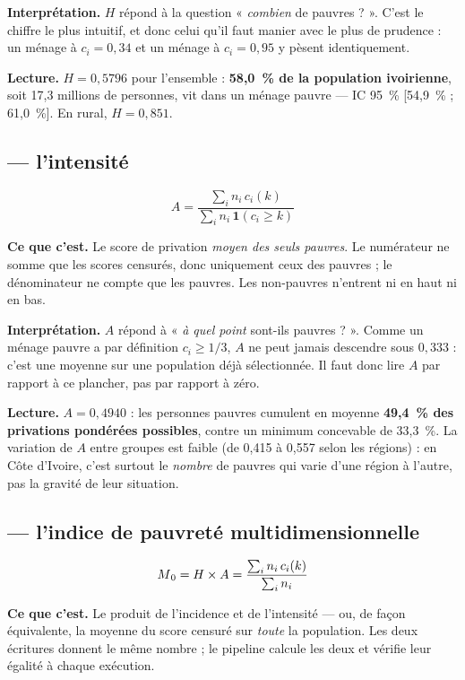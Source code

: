 \documentclass[11pt,a4paper]{article}
\begin{document}
\textbf{Interprétation.} $H$ répond à la question « \emph{combien} de pauvres ? ». C'est le chiffre
le plus intuitif, et donc celui qu'il faut manier avec le plus de prudence : un ménage à $c_i =
0{,}34$ et un ménage à $c_i = 0{,}95$ y pèsent identiquement.

\textbf{Lecture.} $H = 0{,}5796$ pour l'ensemble : \textbf{58,0~\% de la population ivoirienne},
soit 17,3 millions de personnes, vit dans un ménage pauvre --- IC 95~\% [54,9~\% ; 61,0~\%].
En rural, $H = 0{,}851$.

\subsection*{ --- l'intensité}

\[
A = \frac{\sum_i n_i \, c_i(k)}{\sum_i n_i \, \mathbf{1}(c_i \ge k)}
\]

\textbf{Ce que c'est.} Le score de privation \emph{moyen des seuls pauvres}. Le numérateur ne
somme que les scores censurés, donc uniquement ceux des pauvres ; le dénominateur ne compte que
les pauvres. Les non-pauvres n'entrent ni en haut ni en bas.

\textbf{Interprétation.} $A$ répond à « \emph{à quel point} sont-ils pauvres ? ». Comme un ménage
pauvre a par définition $c_i \ge 1/3$, $A$ ne peut jamais descendre sous $0{,}333$ : c'est une
moyenne sur une population déjà sélectionnée. Il faut donc lire $A$ par rapport à ce plancher, pas
par rapport à zéro.

\textbf{Lecture.} $A = 0{,}4940$ : les personnes pauvres cumulent en moyenne \textbf{49,4~\% des
privations pondérées possibles}, contre un minimum concevable de 33,3~\%. La variation de $A$
entre groupes est faible (de 0,415 à 0,557 selon les régions) : en Côte d'Ivoire, c'est surtout le
\emph{nombre} de pauvres qui varie d'une région à l'autre, pas la gravité de leur situation.

\subsection*{ --- l'indice de pauvreté multidimensionnelle}

\[
M\textsubscript{0} = H \times A = \frac{\sum_i n_i \, c_i(k)}{\sum_i n_i}
\]

\textbf{Ce que c'est.} Le produit de l'incidence et de l'intensité --- ou, de façon équivalente,
la moyenne du score censuré sur \emph{toute} la population. Les deux écritures donnent le même
nombre ; le pipeline calcule les deux et vérifie leur égalité à chaque exécution.
\end{document}
